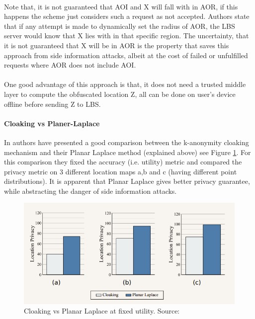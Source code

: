 \documentclass[12pt]{report}
\theoremstyle{named}
\begin{document}
\paragraph{}
Note that, it is not guaranteed that  AOI and X will fall with in AOR, if this happens the scheme just considers such a request as not accepted. Authors state that if any attempt is made to dynamically set the radius of AOR, the LBS server would know that X lies with in that specific region. The uncertainty, that it is not guaranteed that X will be in AOR is the property that saves this approach from side information attacks, albeit at the cost of failed or unfulfilled requests where AOR does not include AOI.
\paragraph{}
One good advantage of this approach is that, it does not need a trusted middle layer to compute the obfuscated location Z, all can be done on user's device offline before sending Z to LBS.
\paragraph{Cloaking vs Planer-Laplace}
In \cite{andres2013geo} authors have presented a good comparison between the k-anonymity cloaking mechanism and their Planar Laplace method (explained above) see Figure \ref{fig:CloakingVsPlanar}. For this comparison they fixed the accuracy (i.e. utility) metric and compared the privacy metric on 3 different location maps a,b and c (having different point distributions). It is apparent that Planar Laplace gives better privacy guarantee, while abstracting the danger of side information attacks.

\begin{figure}[ht]
\centering
        \includegraphics[width=120mm,scale=1]{Images/CloakingVsLaplace.PNG}
    \caption{Cloaking vs Planar Laplace at fixed utility. Source:\cite{andres2013geo}}
    \label{fig:CloakingVsPlanar}
\end{figure}
\end{document}
